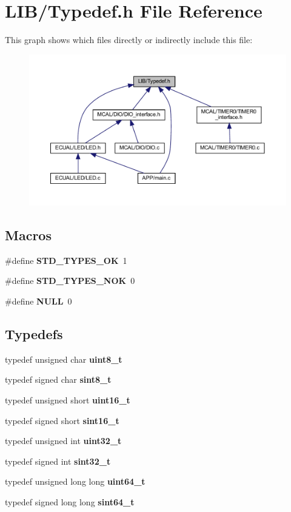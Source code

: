 \section{L\+I\+B/\+Typedef.h File Reference}
\label{_typedef_8h}
This graph shows which files directly or indirectly include this file\+:
\nopagebreak
\begin{figure}[H]
\begin{center}
\leavevmode
\includegraphics[width=350pt]{_typedef_8h__dep__incl}
\end{center}
\end{figure}
\subsection*{Macros}
\begin{DoxyCompactItemize}
\item 
\#define \textbf{ S\+T\+D\+\_\+\+T\+Y\+P\+E\+S\+\_\+\+OK}~1
\item 
\#define \textbf{ S\+T\+D\+\_\+\+T\+Y\+P\+E\+S\+\_\+\+N\+OK}~0
\item 
\#define \textbf{ N\+U\+LL}~0
\end{DoxyCompactItemize}
\subsection*{Typedefs}
\begin{DoxyCompactItemize}
\item 
typedef unsigned char \textbf{ uint8\+\_\+t}
\item 
typedef signed char \textbf{ sint8\+\_\+t}
\item 
typedef unsigned short \textbf{ uint16\+\_\+t}
\item 
typedef signed short \textbf{ sint16\+\_\+t}
\item 
typedef unsigned int \textbf{ uint32\+\_\+t}
\item 
typedef signed int \textbf{ sint32\+\_\+t}
\item 
typedef unsigned long long \textbf{ uint64\+\_\+t}
\item 
typedef signed long long \textbf{ sint64\+\_\+t}
\end{DoxyCompactItemize}



